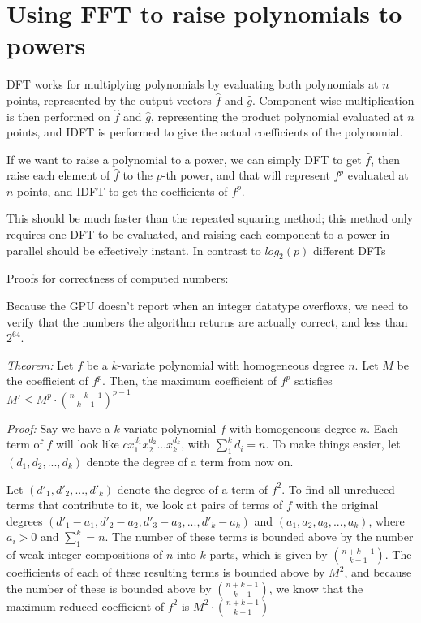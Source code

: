 \documentclass{article}
\begin{document}
\section*{Using FFT to raise polynomials to powers}
DFT works for multiplying polynomials by evaluating both polynomials at $n$ points, represented by the output vectors $\hat{f}$ and $\hat{g}$. Component-wise multiplication is then performed on $\hat{f}$ and $\hat{g}$, representing the product polynomial evaluated at $n$ points, and IDFT is performed to give the actual coefficients of the polynomial.

If we want to raise a polynomial to a power, we can simply DFT to get $\hat{f}$, then raise each element of $\hat{f}$ to the $p$-th power, and that will represent $f^p$ evaluated at $n$ points, and IDFT to get the coefficients of $f^p$.

This should be much faster than the repeated squaring method; this method only requires one DFT to be evaluated, and raising each component to a power in parallel should be effectively instant. In contrast to $log_2(p)$ different DFTs

Proofs for correctness of computed numbers:

Because the GPU doesn't report when an integer datatype overflows, we need to verify that the numbers the algorithm returns are actually correct, and less than $2^{64}$.

\textit{Theorem: } Let $f$ be a $k$-variate polynomial with homogeneous degree $n$. Let $M$ be the coefficient of $f^p$. Then, the maximum coefficient of $f^p$ satisfies $M' \le M^p \cdot \binom{n + k - 1}{k - 1}^{p-1}$

\textit{Proof: } Say we have a $k$-variate polynomial $f$ with homogeneous degree $n$. Each term of $f$ will look like $cx_{1}^{d_1}x_{2}^{d_2}...x_{k}^{d_k}$, with $ \sum_{1}^{k} d_i = n$. To make things easier, let $(d_1, d_2, ... , d_k)$ denote the degree of a term from now on.

Let $(d'_1, d'_2, ... , d'_k)$ denote the degree of a term of $f^2$. To find all unreduced terms that contribute to it, we look at pairs of terms of $f$ with the original degrees $(d'_1 - a_1, d'_2 - a_2, d'_3 - a_3, ... , d'_k - a_k)$ and $(a_1, a_2, a_3, ... , a_k)$, where $a_i > 0$ and $\sum_{1}^{k} = n$. The number of these terms is bounded above by the number of weak integer compositions of $n$ into $k$ parts, which is given by $\binom{n + k - 1}{k - 1}$. The coefficients of each of these resulting terms is bounded above by $M^2$, and because the number of these is bounded above by $\binom{n + k - 1}{k - 1}$, we know that the maximum reduced coefficient of $f^2$ is $M^2 \cdot \binom{n + k - 1}{k - 1}$
\end{document}
